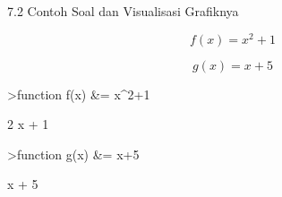 \documentclass[a4paper,10pt]{article}
\begin{document}
\begin{eulernotebook}
\begin{eulercomment}
\begin{eulercomment}
\begin{eulercomment}
\begin{eulercomment}
\begin{eulercomment}
\begin{eulercomment}
\begin{eulercomment}
\begin{eulercomment}
\begin{eulercomment}
\begin{eulercomment}
\begin{eulercomment}
\begin{eulercomment}
\begin{eulercomment}
\begin{eulercomment}
\begin{eulercomment}
\begin{eulercomment}
\begin{eulercomment}
\begin{eulercomment}
\begin{eulercomment}
\begin{eulercomment}
\begin{eulercomment}
\begin{eulercomment}
\begin{eulercomment}
\end{eulercomment}
\begin{eulerttcomment}
     7.2 Contoh Soal dan Visualisasi Grafiknya
\end{eulerttcomment}
\begin{eulercomment}

\end{eulercomment}
\begin{eulerformula}
\[
f(x) = x^2+1
\]
\end{eulerformula}
\begin{eulerformula}
\[
g(x) = x+5
\]
\end{eulerformula}
\begin{eulerprompt}
>function f(x) &= x^2+1
\end{eulerprompt}
\begin{euleroutput}
  
                                   2
                                  x  + 1
  
\end{euleroutput}
\begin{eulerprompt}
>function g(x) &= x+5
\end{eulerprompt}
\begin{euleroutput}
  
                                  x + 5
  

\end{euleroutput}
\end{eulercomment}
\end{eulercomment}
\end{eulercomment}
\end{eulercomment}
\end{eulercomment}
\end{eulercomment}
\end{eulercomment}
\end{eulercomment}
\end{eulercomment}
\end{eulercomment}
\end{eulercomment}
\end{eulercomment}
\end{eulercomment}
\end{eulercomment}
\end{eulercomment}
\end{eulercomment}
\end{eulercomment}
\end{eulercomment}
\end{eulercomment}
\end{eulercomment}
\end{eulercomment}
\end{eulercomment}
\end{eulernotebook}
\end{document}
